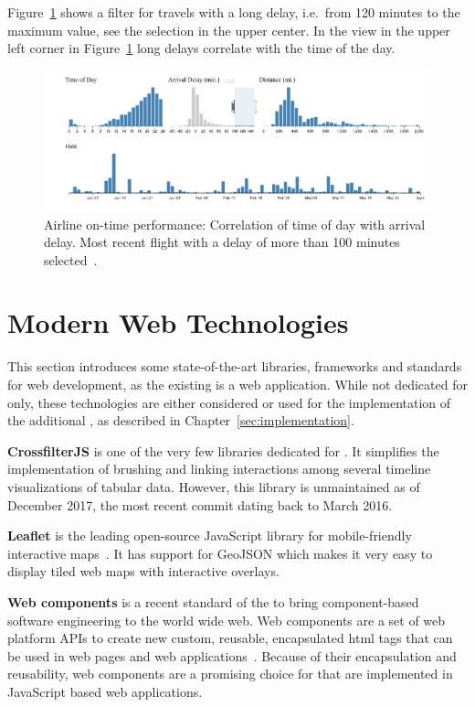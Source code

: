Figure~\ref{fig:research:brushing-linking} shows a filter for travels with a long delay, i.e.\ from 120 minutes to the maximum value, see the selection in the upper center.
In the view in the upper left corner in Figure~\ref{fig:research:brushing-linking} long delays correlate with the time of the day.

\begin{figure}
  \centering
  \includegraphics[width=\textwidth]{figures/related-work/brushing_linking}
  \caption{Airline on-time performance: Correlation of time of day with arrival delay. Most recent flight with a delay of more than 100 minutes selected~\parencite{Bostock2017}.}
  \label{fig:research:brushing-linking}
\end{figure}

\section{Modern Web Technologies}
This section introduces some state-of-the-art libraries, frameworks and standards for web development, as the existing \visan{} is a web application.
While not dedicated for \cmvs{} only, these technologies are either considered or used for the implementation of the additional \gv{}, as described in Chapter~\ref{sec:implementation}.

\textbf{CrossfilterJS} is one of the very few libraries dedicated for \cmvs{}.
It simplifies the implementation of brushing and linking interactions among several timeline visualizations of tabular data.
However, this library is unmaintained as of December 2017, the most recent commit dating back to March 2016.

\textbf{Leaflet} is the leading open-source JavaScript library for mobile-friendly interactive maps~\parencite{Leaflet2017}.
It has support for GeoJSON which makes it very easy to display tiled web maps with interactive overlays.

\textbf{Web components} is a recent standard of the \textcite{W3C2017} to bring component-based software engineering to the world wide web.
Web components are a set of web platform APIs to create new custom, reusable, encapsulated \gls{html} tags that can be used in web pages and web applications~\parencite{WebComponents2017}.
Because of their encapsulation and reusability, web components are a promising choice for \cmvs{} that are implemented in JavaScript based web applications.

